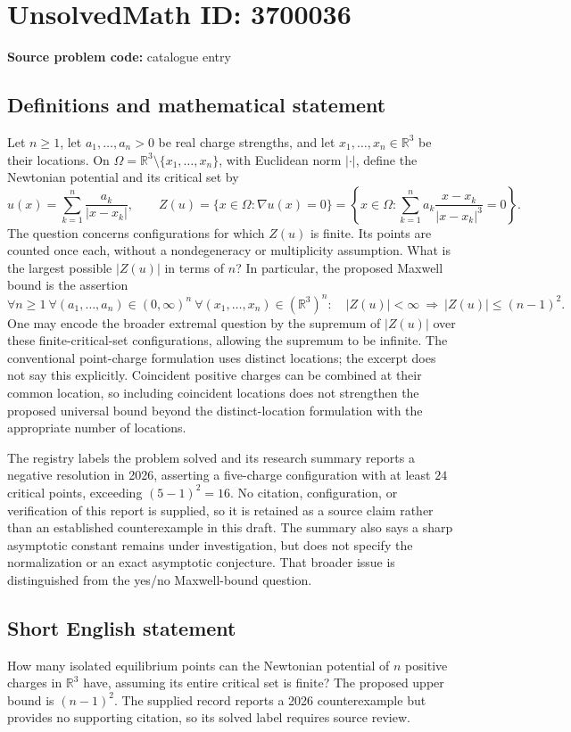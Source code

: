 \documentclass[11pt]{article}
\begin{document}
\section*{UnsolvedMath ID: 3700036}
\textbf{Source problem code:} catalogue entry
\subsection{Definitions and mathematical statement}
Let \(n\ge1\), let \(a_1,\ldots,a_n>0\) be real charge strengths, and let \(x_1,\ldots,x_n\in\mathbb R^3\) be their locations. On \(\Omega=\mathbb R^3\setminus\{x_1,\ldots,x_n\}\), with Euclidean norm \(|\cdot|\), define the Newtonian potential and its critical set by
\[
 u(x)=\sum_{k=1}^n\frac{a_k}{|x-x_k|},\qquad
 Z(u)=\{x\in\Omega:\nabla u(x)=0\}
 =\left\{x\in\Omega:\sum_{k=1}^n a_k\frac{x-x_k}{|x-x_k|^3}=0\right\}.
\]
The question concerns configurations for which \(Z(u)\) is finite. Its points are counted once each, without a nondegeneracy or multiplicity assumption. What is the largest possible \(|Z(u)|\) in terms of \(n\)? In particular, the proposed Maxwell bound is the assertion
\[
\forall n\ge1\ \forall(a_1,\ldots,a_n)\in(0,\infty)^n\
\forall(x_1,\ldots,x_n)\in(\mathbb R^3)^n:\quad
 |Z(u)|<\infty\ \Longrightarrow\ |Z(u)|\le(n-1)^2.
\]
One may encode the broader extremal question by the supremum of \(|Z(u)|\) over these finite-critical-set configurations, allowing the supremum to be infinite. The conventional point-charge formulation uses distinct locations; the excerpt does not say this explicitly. Coincident positive charges can be combined at their common location, so including coincident locations does not strengthen the proposed universal bound beyond the distinct-location formulation with the appropriate number of locations.

The registry labels the problem solved and its research summary reports a negative resolution in 2026, asserting a five-charge configuration with at least \(24\) critical points, exceeding \((5-1)^2=16\). No citation, configuration, or verification of this report is supplied, so it is retained as a source claim rather than an established counterexample in this draft. The summary also says a sharp asymptotic constant remains under investigation, but does not specify the normalization or an exact asymptotic conjecture. That broader issue is distinguished from the yes/no Maxwell-bound question.
\subsection{Short English statement}
How many isolated equilibrium points can the Newtonian potential of \(n\) positive charges in \(\mathbb R^3\) have, assuming its entire critical set is finite? The proposed upper bound is \((n-1)^2\). The supplied record reports a 2026 counterexample but provides no supporting citation, so its solved label requires source review.
\end{document}
